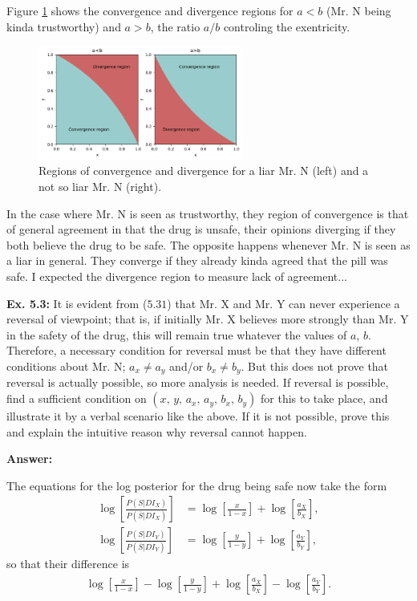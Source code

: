 \documentclass{article}
\begin{document}
Figure \ref{fig:5.2} shows the convergence and divergence regions for $a<b$ (Mr. N being kinda trustworthy) and $a>b$, the ratio $a/b$ controling the exentricity.

\begin{figure}[h]
	\center
	\includegraphics[width=0.6\textwidth]{Numerical/5.2.png}
	\caption{Regions of convergence and divergence for a liar Mr. N (left) and a not so liar Mr. N (right).}
	\label{fig:5.2}
\end{figure}

In the case where Mr. N is seen as trustworthy, they region of convergence is that of general agreement in that the drug is unsafe, their opinions diverging if they both believe the drug to be safe. The opposite happens whenever Mr. N is seen as a liar in general. They converge if they already kinda agreed that the pill was safe. I expected the divergence region to measure lack of agreement...

\textbf{Ex. 5.3: }It is evident from ($5.31$) that Mr. X and Mr. Y can never experience a reversal of viewpoint; that is, if initially Mr. X believes more strongly than Mr. Y in the safety of the drug, this will remain true whatever the values of $a$, $b$. Therefore, a necessary condition for reversal must be that they have different conditions about Mr. N; $a_x\neq a_y$ and/or $b_x\neq b_y$. But this does not prove that reversal is actually possible, so more analysis is needed. If reversal is possible, find a sufficient condition on $(x,\,y,\,a_x,\,a_y,\,b_x,\,b_y)$ for this to take place, and illustrate it by a verbal scenario like the above. If it is not possible, prove this and explain the intuitive reason why reversal cannot happen.

\textbf{Answer:}

The equations for the log posterior for the drug being safe now take the form
\begin{align*}
	\log\left[\frac{P(S|DI_X)}{P(\overline{S}|DI_X)}\right]&=\log\left[\frac{x}{1-x}\right]+\log\left[\frac{a_X}{b_X}\right],\\
	\log\left[\frac{P(S|DI_Y)}{P(\overline{S}|DI_Y)}\right]&=\log\left[\frac{y}{1-y}\right]+\log\left[\frac{a_Y}{b_Y}\right],
\end{align*}
so that their difference is
\begin{align*}
	\log\left[\frac{x}{1-x}\right]-\log\left[\frac{y}{1-y}\right]+\log\left[\frac{a_X}{b_X}\right]-\log\left[\frac{a_Y}{b_Y}\right].
\end{align*}
\end{document}
